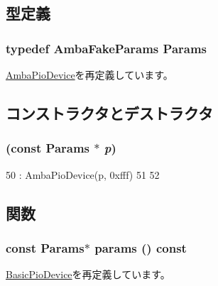 \subsection{型定義}
\hypertarget{classAmbaFake_af81895617462b041d86cd650bb1e27d3}{
\subsubsection[{Params}]{\setlength{\rightskip}{0pt plus 5cm}typedef AmbaFakeParams {\bf Params}}}
\label{classAmbaFake_af81895617462b041d86cd650bb1e27d3}


\hyperlink{classAmbaPioDevice_ab091a3a8ffa1f3152ec35e30d1b384d5}{AmbaPioDevice}を再定義しています。

\subsection{コンストラクタとデストラクタ}
\hypertarget{classAmbaFake_a208b0127a0e255b708ddd1296d0ff092}{
\subsubsection[{AmbaFake}]{ (const {\bf Params} $\ast$ {\em p})}}
\label{classAmbaFake_a208b0127a0e255b708ddd1296d0ff092}



\begin{DoxyCode}
50     : AmbaPioDevice(p, 0xfff)
51 {
52 }
\end{DoxyCode}


\subsection{関数}
\hypertarget{classAmbaFake_acd3c3feb78ae7a8f88fe0f110a718dff}{
\subsubsection[{params}]{\setlength{\rightskip}{0pt plus 5cm}const {\bf Params}$\ast$ params () const}}
\label{classAmbaFake_acd3c3feb78ae7a8f88fe0f110a718dff}


\hyperlink{classBasicPioDevice_acd3c3feb78ae7a8f88fe0f110a718dff}{BasicPioDevice}を再定義しています。


